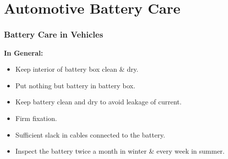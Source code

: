 \documentclass{beamer}
\begin{document}
\section{Automotive Battery Care}

{ %
    \begin{frame}[plain]
     \end{frame}
}

\begin{frame}     %
  \frametitle{Battery Care in Vehicles}
  \fontsize{8pt}{14}\selectfont
  \textbf{In General:}
  \begin{itemize}
    \item Keep interior of battery box clean \& dry.
    \item Put nothing but battery in battery box.
    \item Keep battery clean and dry to avoid leakage of current.
    \item Firm fixation.
    \item Sufficient slack in cables connected to the battery.
    \item Inspect the battery twice a month in winter \& every week in summer.
  \end{itemize}
\end{frame}
\end{document}
